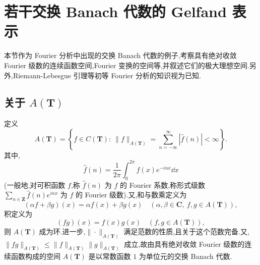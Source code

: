 \section{若干交换 Banach 代数的 Gelfand 表示}\label{sec:3.2}


本节作为 Fourier 分析中出现的交换 Banach 代数的例子,考察具有绝对收敛 Fourier 级数的连续函数空间,Fourier 变换的空间等,并叙述它们的极大理想空间.另外,Riemann-Lebesgue 引理等初等 Fourier 分析的知识视为已知.

\subsection{\texorpdfstring{关于 $A(\mathbf{T})$}{关于 A(T)}}\label{sec:3.2.1}

\begin{definition}\label{def:3.2.1}
定义
\begin{equation*}
A(\mathbf{T}) = \left\{f \in C(\mathbf{T}):\ \|f\|_{A(\mathbf{T})} = \sum_{n=-\infty}^{\infty}|\hat{f}(n)| < \infty\right\}.
\end{equation*}
其中,
\begin{equation*}
\hat{f}(n) = \frac{1}{2\pi}\int_{0}^{2\pi}f(x)e^{-inx}\dd x
\end{equation*}
(一般地,对可积函数 $f$,称 $\hat{f}(n)$ 为 $f$ 的 Fourier 系数,称形式级数 $\sum_{n \in \mathbf{Z}}\hat{f}(n)e^{inx}$ 为 $f$ 的 Fourier 级数).又,和与数乘定义为
\begin{equation*}
(\alpha f + \beta g)(x) = \alpha f(x) + \beta g(x) \quad (\alpha, \beta \in \mathbf{C},\ f, g \in A(\mathbf{T})),
\end{equation*}
积定义为
\begin{equation*}
(fg)(x) = f(x)g(x) \quad (f, g \in A(\mathbf{T})),
\end{equation*}
则 $A(\mathbf{T})$ 成为环.进一步,$\|\cdot\|_{A(\mathbf{T})}$ 满足范数的性质,且关于这个范数完备.又,$\|fg\|_{A(\mathbf{T})} \leq \|f\|_{A(\mathbf{T})}\|g\|_{A(\mathbf{T})}$ 成立,故由具有绝对收敛 Fourier 级数的连续函数构成的空间 $A(\mathbf{T})$ 是以常数函数 $1$ 为单位元的交换 Banach 代数.
\end{definition}


